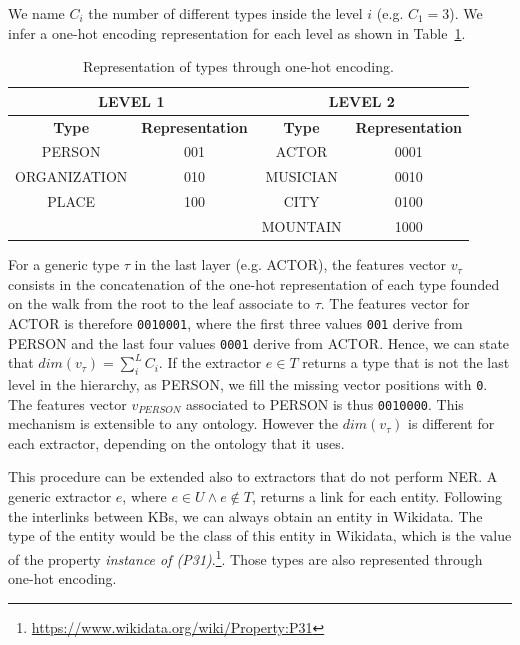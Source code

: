 \documentclass{llncs}
\newcommand{\tabref}[1]{\mbox{Table~\ref{#1}}}
\begin{document}
We name $C_i$ the number of different types inside the level $i$ (e.g. $C_1 = 3$). We infer a one-hot encoding representation for each level as shown in \tabref{tab:onehottype}.

\begin{table}
\centering
\label{tab:onehottype}
\begin{tabular}{|c|c|c|c|}
\hline
\multicolumn{2}{|c|}{\textbf{LEVEL 1}} & \multicolumn{2}{|c|}{\textbf{LEVEL 2}} \\ \hline
\textbf{Type}  & \textbf{Representation}  & \textbf{Type}  & \textbf{Representation}    \\ \hline
PERSON          & 001   & ACTOR     & 0001  \\ \hline
ORGANIZATION    & 010   & MUSICIAN  & 0010  \\ \hline
PLACE           & 100   & CITY      & 0100  \\ \hline
      &       & MOUNTAIN  & 1000  \\ \hline
\end{tabular}
\bigskip
\caption{Representation of types through one-hot encoding.}
\end{table}

For a generic type $\tau$ in the last layer (e.g. ACTOR), the features vector $v_{\tau}$ consists in the concatenation of the one-hot representation of each type founded on the walk from the root to the leaf associate to $\tau$. The features vector for ACTOR is therefore  \texttt{0010001}, where the first three values \texttt{001} derive from PERSON and the last four values \texttt{0001} derive from ACTOR. Hence, we can state that $dim(v_{\tau})= \sum_{i}^{L}C_i$. If the extractor $e \in T$ returns a type that is not the last level in the hierarchy, as PERSON, we fill the missing vector positions with \texttt{0}. The features vector $v_{PERSON}$ associated to PERSON is thus \texttt{0010000}. This mechanism is extensible to any ontology. However the $dim(v_{\tau})$ is different for each extractor, depending on the ontology that it uses. 

This procedure can be extended also to extractors that do not perform NER. A generic extractor $e$, where $e \in U \wedge e \not\in T$, returns a link for each entity. Following the interlinks between KBs, we can always obtain an entity in Wikidata. The type of the entity would be the class of this entity in Wikidata, which is the value of the property \textit{instance of (P31)}.\footnote{\label{P31} \url{https://www.wikidata.org/wiki/Property:P31}}. Those types are also represented through one-hot encoding.
\end{document}
